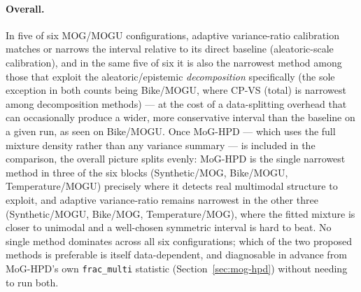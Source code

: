 \documentclass[11pt]{article}
\begin{document}
\paragraph{Overall.} In five of six MOG/MOGU configurations, adaptive variance-ratio calibration
matches or narrows the interval relative to its direct baseline (aleatoric-scale calibration), and
in the same five of six it is also the narrowest method among those that exploit the
aleatoric/epistemic \emph{decomposition} specifically (the sole exception in both counts being
Bike/MOGU, where CP-VS (total) is narrowest among decomposition methods) — at the cost of a
data-splitting overhead that can occasionally produce a wider, more conservative interval than the
baseline on a given run, as seen on Bike/MOGU. Once MoG-HPD — which uses the full mixture density
rather than any variance summary — is included in the comparison, the overall picture splits
evenly: MoG-HPD is the single narrowest method in three of the six blocks (Synthetic/MOG,
Bike/MOGU, Temperature/MOGU) precisely where it detects real multimodal structure to exploit, and
adaptive variance-ratio remains narrowest in the other three (Synthetic/MOGU, Bike/MOG,
Temperature/MOG), where the fitted mixture is closer to unimodal and a well-chosen symmetric
interval is hard to beat. No single method dominates across all six configurations; which of the
two proposed methods is preferable is itself data-dependent, and diagnosable in advance from
MoG-HPD's own \texttt{frac\_multi} statistic (Section~\ref{sec:mog-hpd}) without needing to run
both.
\end{document}
